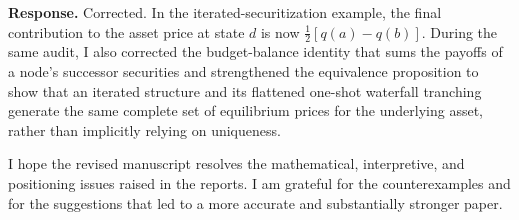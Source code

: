 \documentclass[11pt]{article}
\newcommand{\response}[1]{\par\noindent\textbf{Response.} #1\par}
\begin{document}
\response{Corrected. In the iterated-securitization example, the final contribution to the asset price at state $d$ is now $\tfrac12[q(a)-q(b)]$. During the same audit, I also corrected the budget-balance identity that sums the payoffs of a node's successor securities and strengthened the equivalence proposition to show that an iterated structure and its flattened one-shot waterfall tranching generate the same complete set of equilibrium prices for the underlying asset, rather than implicitly relying on uniqueness.}

\bigskip

I hope the revised manuscript resolves the mathematical, interpretive, and positioning issues raised in the reports. I am grateful for the counterexamples and for the suggestions that led to a more accurate and substantially stronger paper.
\end{document}

